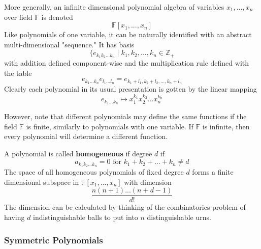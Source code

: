     \begin{definition}
      More generally, an infinite dimensional polynomial algebra of variables $x_1, ..., x_n$ over field $\mathbb{F}$ is denoted
      \begin{equation}
        \mathbb{F}[x_1, ..., x_n]
      \end{equation}
      Like polynomials of one variable, it can be naturally identified with an abstract multi-dimensional "sequence." It has basis 
      \begin{equation}
        \{e_{k_1 k_2 ... k_n} \;|\; k_1, k_2, ..., k_n \in \mathbb{Z}_+
      \end{equation}
      with addition defined component-wise and the multiplication rule defined with the table
      \begin{equation}
        e_{k_1...k_n} e_{l_1 ... l_n} = e_{k_1 + l_1, k_2 + l_2, ..., k_n + l_n}
      \end{equation}
      Clearly each polynomial in its usual presentation is gotten by the linear mapping
      \begin{equation}
        e_{k_1 ... k_n} \mapsto x_1^{k_1} x_2^{k_2} ... x_n^{k_n}
      \end{equation}
    \end{definition}

    However, note that different polynomials may define the same functions if the field $\mathbb{F}$ is finite, similarly to polynomials with one variable. If $\mathbb{F}$ is infinite, then every polynomial will determine a different function. 

    \begin{definition}
      A polynomial is called \textbf{homogeneous} if degree $d$ if 
      \begin{equation}
        a_{k_1 k_2 ... k_n} = 0 \text{ for } k_1 + k_2 + ... + k_n \neq d
      \end{equation}
      The space of all homogeneous polynomials of fixed degree $d$ forms a finite dimensional subspace in $\mathbb{F}[x_1, ..., x_n]$ with dimension 
      \begin{equation}
        \frac{n(n+1)...(n+d-1)}{d!}
      \end{equation}
      The dimension can be calculated by thinking of the combinatorics problem of having $d$ indistinguishable balls to put into $n$ distinguishable urns. 
    \end{definition}

  \subsubsection{Symmetric Polynomials}

